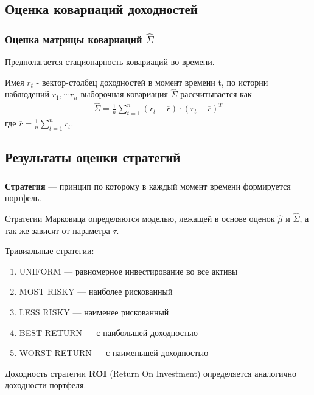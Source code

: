 \documentclass{beamer}
\begin{document}
\subsection{Оценка ковариаций доходностей}

\begin{frame}
    \frametitle{Оценка матрицы ковариаций $\hat{\Sigma}$}
    Предполагается стационарность ковариаций во времени.

    Имея $r_t$ - вектор-столбец доходностей в момент времени t, по истории наблюдений $r_1, \cdots r_n$ 
    выборочная ковариация $\hat{\Sigma}$ рассчитывается как 
    \begin{align*}
        \hat{\Sigma} = \frac{1}{n} \sum_{t=1}^{n}(r_t - \overline{r}) \cdot (r_t - \overline{r})^T
    \end{align*}
    где $\overline{r} = \frac{1}{n} \sum_{t=1}^{n} r_t$.    
\end{frame}

\subsection{Результаты оценки стратегий}

\begin{frame}
    \frametitle{}
    \textbf{Стратегия} --- принцип по которому в каждый момент времени формируется портфель.

    Стратегии Марковица определяются моделью, лежащей в основе оценок $\hat{\mu}$ и $\hat{\Sigma}$,
    а так же зависят от параметра $\tau$.
    
    Тривиальные стратегии:
    \begin{enumerate}
        \item UNIFORM --- равномерное инвестирование во все активы
        \item MOST RISKY --- наиболее рискованный
        \item LESS RISKY --- наименее рискованный
        \item BEST RETURN --- с наибольшей доходностью
        \item WORST RETURN --- с наименьшей доходностью
    \end{enumerate}

    Доходность стратегии \textbf{ROI} (Return On Investment) определяется аналогично доходности портфеля.
\end{frame} 
\end{document}
